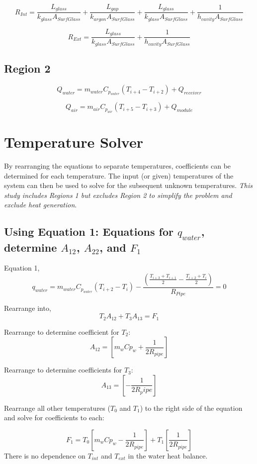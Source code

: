 \documentclass[12pt]{report}
\begin{document}
$$ R_{Int} = \frac{L_{glass}}{k_{glass}  A_{SurfGlass}} 
	+ \frac{L_{gap}}{k_{argon}  A_{SurfGlass}} 
	+ \frac{L_{glass}}{k_{glass}  A_{SurfGlass}} + \frac{1}{h_{cavity} A_{SurfGlass}}$$
	
$$ R_{Ext} = \frac{L_{glass}}{k_{glass}  A_{SurfGlass}} + \frac{1}{h_{cavity} A_{SurfGlass}}$$

\subsection{Region 2}

$$ Q_{water} = m_{water} C_{p_{water}} (T_{i+4} - T_{i+2}) + Q_{receiver} $$

$$ Q_{air} = m_{air} C_{p_{air}} (T_{i+5} - T_{i+3}) + Q_{module} $$
        
\section{Temperature Solver}
By rearranging the equations to separate temperatures, coefficients can be determined for each temperature. The input (or given) temperatures of the system can then be used to solve for the subsequent unknown temperatures. \textit{This study includes Regions 1 but excludes Region 2 to simplify the problem and exclude heat generation}.

\subsection{Using Equation 1: Equations for $q_{water}$, determine $A_{12}$, $A_{22}$, and $F_1$}

Equation 1, 
$$q_{water} = m_{water} C_{p_{water}} (T_{i+2}-T_i) - 
	\frac
	{\left( 
		\frac{T_{i+3}+T_{i+1}}{2} - \frac{T_{i+2}+T_{i}}{2} 
		\right)}
	{R_{Pipe}}
	= 0 $$

Rearrange into,
$$ T_2 A_{12} + T_3 A_{13} = F_1 $$

Rearrange to determine coefficient for $T_2$:
$$ A_{12} = [m_w Cp_w + \frac{1}{2 R_{pipe}}] $$

Rearrange to determine coefficients for $T_3$:
$$ A_{13} = [- \frac{1}{2 R_pipe}] $$

Rearrange all other temperatures ($T_0$ and $T_1$) to the right side of the equation and solve for coefficients to each:

$$ F_1 = 
	T_0 [m_w Cp_w - \frac{1}{2 R_{pipe}}]
	+ T_1 [\frac{1}{2 R_{pipe}}]$$
There is no dependence on $T_{int}$ and $T_{ext}$ in the water heat balance.
\end{document}
